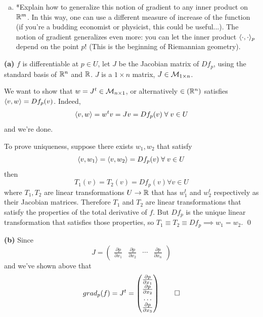 \documentclass[a4paper, 12pt]{article}
\begin{document}
\begin{problem} 
\begin{enumerate} [(a)]
    \item *Explain how to generalize this notion of gradient to any inner product on $\mathbb{R}^m$. In this way, one can use a different measure of increase of the function (if you're a budding economist or physicist, this could be useful...). The notion of gradient generalizes even more: you can let the inner product $\langle \cdot, \cdot \rangle_p$ depend on the point $p$! (This is the beginning of Riemannian geometry).
\end{enumerate}

\end{problem}
\begin{solution}
    \textbf{(a)} $f$ is differentiable at $p \in U$, let $J$ be the Jacobian matrix of $Df_p$, using the standard basis of $\mathbb{R}^n$ and $\mathbb{R}$. $J$ is a $1 \times n$ matrix, $J \in \mathcal{M}_{1 \times n}$.

    We want to show that $w = J^t \in \mathcal{M}_{n \times 1}$, or alternatively $\in (\mathbb{R}^n)$ satisfies $\langle v, w \rangle = Df_p(v)$. Indeed, \[
        \iprod{v}{w} = w^t v = J v = Df_p(v) \forall v \in U
    \]
    and we're done.

    To prove uniqueness, suppose there exists $w_1, w_2$ that satisfy \[
        \iprod{v}{w_1} = \iprod{v}{w_2} = Df_p(v) \forall v \in U
    \]
    then \[
        T_1(v) = T_2(v) = Df_p(v) \forall v \in U
    \]
    where $T_1, T_2$ are linear transformations $U \to \mathbb{R}$ that has $w_1^t$ and $w_2^t$ respectively as their Jacobian matrices. Therefore $T_1$ and $T_2$ are linear transformations that satisfy the properties of the total derivative of $f$. But $Df_p$ is the unique linear transformation that satisfies those properties, so $T_1 \equiv T_2 \equiv Df_p \implies w_1 = w_2$. \qed

    \textbf{(b)} Since \[
        J = \begin{pmatrix}
            \frac{\partial p }{\partial x_1} & \frac{\partial p }{\partial x_2} & \cdots & \frac{\partial p }{\partial x_n}
        \end{pmatrix}
    \]
    and we've shown above that \[
        grad_p(f) = J^t = \begin{pmatrix}
            \frac{\partial p }{\partial x_1} \\
            \frac{\partial p }{\partial x_2} \\
            \dots                            \\
            \frac{\partial p }{\partial x_3} \\
        \end{pmatrix} \qed
    \]


\end{solution}
\end{document}
